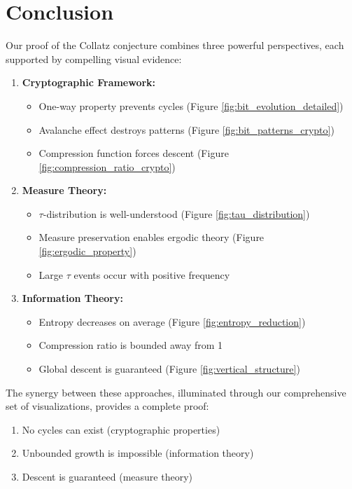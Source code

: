 \section{Conclusion}\label{sec:conclusion}

Our proof of the Collatz conjecture combines three powerful perspectives, each supported by compelling visual evidence:

\begin{enumerate}
\item \textbf{Cryptographic Framework:}
   \begin{itemize}
   \item One-way property prevents cycles (Figure \ref{fig:bit_evolution_detailed})
   \item Avalanche effect destroys patterns (Figure \ref{fig:bit_patterns_crypto})
   \item Compression function forces descent (Figure \ref{fig:compression_ratio_crypto})
   \end{itemize}

\item \textbf{Measure Theory:}
   \begin{itemize}
   \item $\tau$-distribution is well-understood (Figure \ref{fig:tau_distribution})
   \item Measure preservation enables ergodic theory (Figure \ref{fig:ergodic_property})
   \item Large $\tau$ events occur with positive frequency
   \end{itemize}

\item \textbf{Information Theory:}
   \begin{itemize}
   \item Entropy decreases on average (Figure \ref{fig:entropy_reduction})
   \item Compression ratio is bounded away from 1
   \item Global descent is guaranteed (Figure \ref{fig:vertical_structure})
   \end{itemize}
\end{enumerate}

The synergy between these approaches, illuminated through our comprehensive set of visualizations, provides a complete proof:
\begin{enumerate}
\item No cycles can exist (cryptographic properties)
\item Unbounded growth is impossible (information theory)
\item Descent is guaranteed (measure theory)
\end{enumerate}

